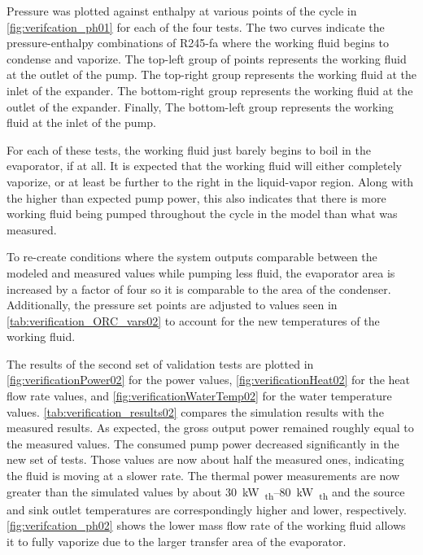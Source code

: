 
Pressure was plotted against enthalpy at various points of the cycle in \autoref{fig:verifcation_ph01} for each of the four tests. The two curves indicate the pressure-enthalpy combinations of R245-fa where the working fluid begins to condense and vaporize. The top-left group of points represents the working fluid at the outlet of the pump. The top-right group represents the working fluid at the inlet of the expander. The bottom-right group represents the working fluid at the outlet of the expander. Finally, The bottom-left group represents the working fluid at the inlet of the pump.


For each of these tests, the working fluid just barely begins to boil in the evaporator, if at all. It is expected that the working fluid will either completely vaporize, or at least be further to the right in the liquid-vapor region. Along with the higher than expected pump power, this also indicates that there is more working fluid being pumped throughout the cycle in the model than what was measured.

To re-create conditions where the system outputs comparable between the modeled and measured values while pumping less fluid, the evaporator area is increased by a factor of four so it is comparable to the area of the condenser. Additionally, the pressure set points are adjusted to values seen in \autoref{tab:verification_ORC_vars02} to account for the new temperatures of the working fluid.


The results of the second set of validation tests are plotted in \autoref{fig:verificationPower02} for the power values, \autoref{fig:verificationHeat02} for the heat flow rate values, and \autoref{fig:verificationWaterTemp02} for the water temperature values. \autoref{tab:verification_results02} compares the simulation results with the measured results. As expected, the gross output power remained roughly equal to the measured values. The consumed pump power decreased significantly in the new set of tests. Those values are now about half the measured ones, indicating the fluid is moving at a slower rate. The thermal power measurements are now greater than the simulated values by about \SIrange{30}{80}{\kilo\watt\textsubscript{th}} and the source and sink outlet temperatures are correspondingly higher and lower, respectively. \autoref{fig:verifcation_ph02} shows the lower mass flow rate of the working fluid allows it to fully vaporize due to the larger transfer area of the evaporator. 







